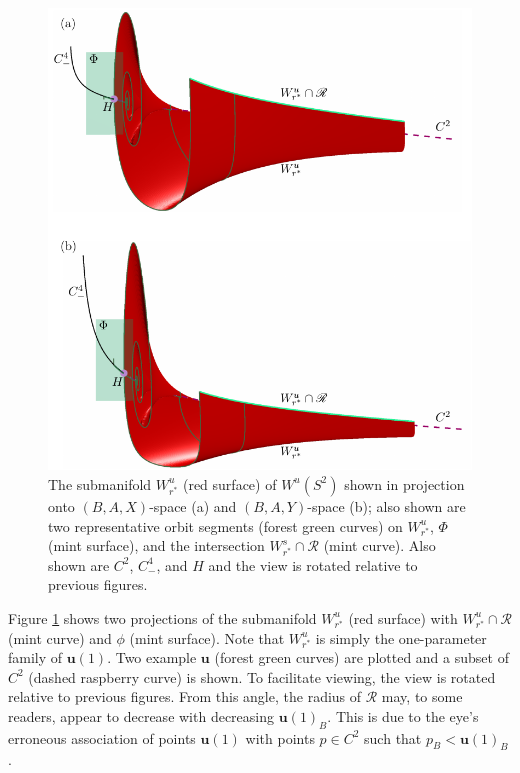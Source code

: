 \documentclass{ws-ijbc}
\begin{document}
\begin{figure}[H]
\centering
\includegraphics[]{./figures/MKMO_7.pdf}
\caption{The submanifold $W^u_{r^*}$ (red surface) of $W^u(S^2)$ shown in projection onto $(B,A,X)$-space (a) and $(B,A,Y)$-space (b); also shown are two representative orbit segments (forest green curves) on $W^u_{r^*}$, $\Phi$ (mint surface), and the intersection $W^s_{r^*}\cap\mathscr{R}$ (mint curve).  Also shown are $C^2$, $C^4_-$, and $H$ and the view is rotated relative to previous figures.}
\label{figure_7}
\end{figure}

Figure \ref{figure_7} shows two projections of the submanifold $W^u_{r^*}$ (red surface) with $W^u_{r^*} \cap \mathscr{R}$ (mint curve) and $\phi$ (mint surface).  Note that $W^u_{r^*}$ is simply the one-parameter family of $\mathbf{u}(1)$.  Two example $\mathbf{u}$ (forest green curves) are plotted and a subset of $C^2$ (dashed raspberry curve) is shown.  To facilitate viewing, the view is rotated relative to previous figures.  From this angle, the radius of $\mathscr{R}$ may, to some readers, appear to decrease with decreasing $\mathbf{u}(1)_B$.  This is due to the eye's erroneous association of points $\mathbf{u}(1)$ with points $p \in C^2$ such that $p_B < \mathbf{u}(1)_B$.
\end{document}
